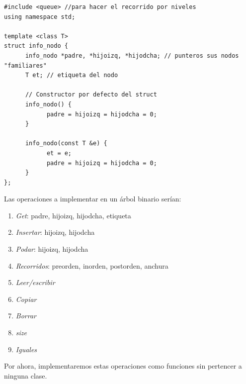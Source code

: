 \documentclass[10pt,a4paper,spanish]{report}
\begin{document}
\begin{verbatim}
#include <queue> //para hacer el recorrido por niveles
using namespace std;

template <class T>
struct info_nodo {
      info_nodo *padre, *hijoizq, *hijodcha; // punteros sus nodos "familiares"
      T et; // etiqueta del nodo

      // Constructor por defecto del struct
      info_nodo() {
            padre = hijoizq = hijodcha = 0;
      }

      info_nodo(const T &e) {
            et = e;
            padre = hijoizq = hijodcha = 0;
      }
};
\end{verbatim}

\noindent
Las operaciones a implementar en un árbol binario serían:
\begin{enumerate}[---]
\item \textit{\textcolor[rgb]{0.3,0.4,0.8}{Get}}: padre, hijoizq, hijodcha, etiqueta
\item \textit{\textcolor[rgb]{0.3,0.4,0.8}{Insertar}}: hijoizq, hijodcha
\item \textit{\textcolor[rgb]{0.3,0.4,0.8}{Podar}}: hijoizq, hijodcha
\item \textit{\textcolor[rgb]{0.3,0.4,0.8}{Recorridos}}: preorden, inorden, postorden, anchura
\item \textit{\textcolor[rgb]{0.3,0.4,0.8}{Leer/escribir}}
\item \textit{\textcolor[rgb]{0.3,0.4,0.8}{Copiar}}
\item \textit{\textcolor[rgb]{0.3,0.4,0.8}{Borrar}}
\item \textit{\textcolor[rgb]{0.3,0.4,0.8}{size}}
\item \textit{\textcolor[rgb]{0.3,0.4,0.8}{Iguales}}
\end{enumerate}

\noindent
Por ahora, implementaremos estas operaciones como funciones sin pertencer a ninguna clase.
\end{document}
